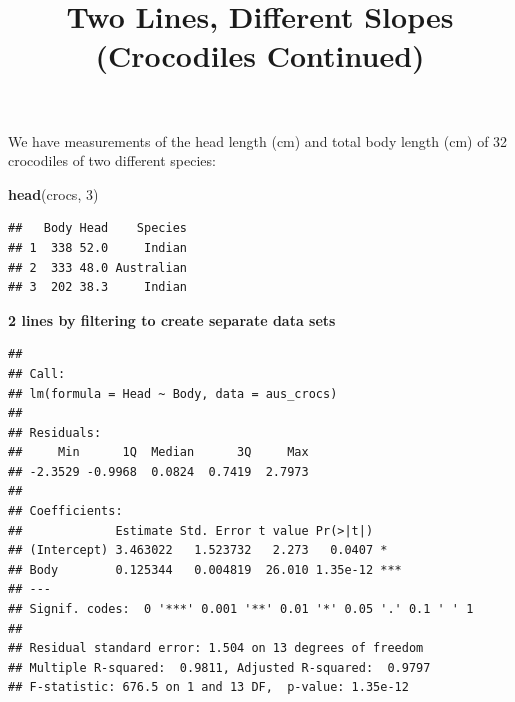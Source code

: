 \documentclass[]{article}
\title{Two Lines, Different Slopes (Crocodiles Continued)}
\author{}
\date{}
\newenvironment{Shaded}{\begin{snugshade}}{\end{snugshade}}
\newcommand{\KeywordTok}[1]{\textcolor[rgb]{0.13,0.29,0.53}{\textbf{#1}}}
\newcommand{\DataTypeTok}[1]{\textcolor[rgb]{0.13,0.29,0.53}{#1}}
\newcommand{\DecValTok}[1]{\textcolor[rgb]{0.00,0.00,0.81}{#1}}
\newcommand{\StringTok}[1]{\textcolor[rgb]{0.31,0.60,0.02}{#1}}
\newcommand{\OperatorTok}[1]{\textcolor[rgb]{0.81,0.36,0.00}{\textbf{#1}}}
\newcommand{\NormalTok}[1]{#1}
\begin{document}
\maketitle

We have measurements of the head length (cm) and total body length (cm)
of 32 crocodiles of two different species:

\begin{Shaded}
\begin{Highlighting}[]
\KeywordTok{head}\NormalTok{(crocs, }\DecValTok{3}\NormalTok{)}
\end{Highlighting}
\end{Shaded}

\begin{verbatim}
##   Body Head    Species
## 1  338 52.0     Indian
## 2  333 48.0 Australian
## 3  202 38.3     Indian
\end{verbatim}

\textbf{2 lines by filtering to create separate data sets}

\begin{Shaded}
\end{Shaded}

\begin{verbatim}
## 
## Call:
## lm(formula = Head ~ Body, data = aus_crocs)
## 
## Residuals:
##     Min      1Q  Median      3Q     Max 
## -2.3529 -0.9968  0.0824  0.7419  2.7973 
## 
## Coefficients:
##             Estimate Std. Error t value Pr(>|t|)    
## (Intercept) 3.463022   1.523732   2.273   0.0407 *  
## Body        0.125344   0.004819  26.010 1.35e-12 ***
## ---
## Signif. codes:  0 '***' 0.001 '**' 0.01 '*' 0.05 '.' 0.1 ' ' 1
## 
## Residual standard error: 1.504 on 13 degrees of freedom
## Multiple R-squared:  0.9811, Adjusted R-squared:  0.9797 
## F-statistic: 676.5 on 1 and 13 DF,  p-value: 1.35e-12
\end{verbatim}

\begin{Shaded}
\end{Shaded}
\end{document}
